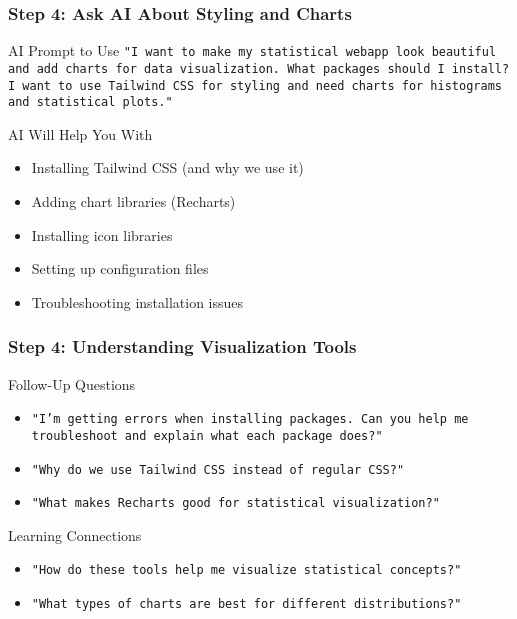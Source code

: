 \documentclass[aspectratio=169]{beamer}
\begin{document}
\begin{frame}
\frametitle{Step 4: Ask AI About Styling and Charts}
\begin{alertblock}{AI Prompt to Use}
\texttt{"I want to make my statistical webapp look beautiful and add charts for data visualization. What packages should I install? I want to use Tailwind CSS for styling and need charts for histograms and statistical plots."}
\end{alertblock}

\begin{exampleblock}{AI Will Help You With}
\begin{itemize}
\item Installing Tailwind CSS (and why we use it)
\item Adding chart libraries (Recharts)
\item Installing icon libraries
\item Setting up configuration files
\item Troubleshooting installation issues
\end{itemize}
\end{exampleblock}
\end{frame}

\begin{frame}
\frametitle{Step 4: Understanding Visualization Tools}
\begin{alertblock}{Follow-Up Questions}
\begin{itemize}
\item \texttt{"I'm getting errors when installing packages. Can you help me troubleshoot and explain what each package does?"}
\item \texttt{"Why do we use Tailwind CSS instead of regular CSS?"}
\item \texttt{"What makes Recharts good for statistical visualization?"}
\end{itemize}
\end{alertblock}

\begin{exampleblock}{Learning Connections}
\begin{itemize}
\item \texttt{"How do these tools help me visualize statistical concepts?"}
\item \texttt{"What types of charts are best for different distributions?"}
\end{itemize}
\end{exampleblock}
\end{frame}
\end{document}
